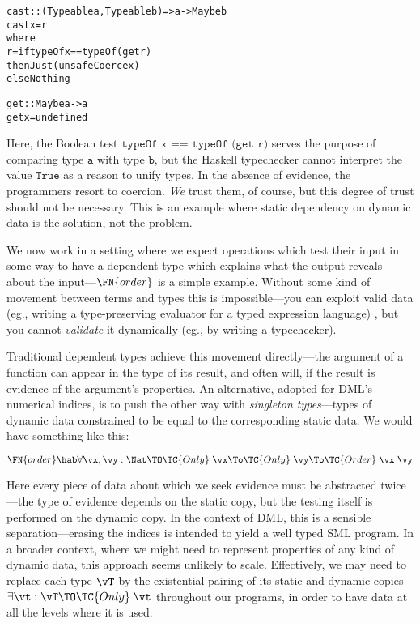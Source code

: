 \documentclass{fundam}
\begin{document}
\begin{alltt}
  cast :: (Typeable a, Typeable b) => a -> Maybe b
  cast x = r
         where
           r = if typeOf x == typeOf (get r)
               then Just (unsafeCoerce x)
               else Nothing

           get :: Maybe a -> a
           get x = undefined
\end{alltt}

Here, the Boolean test $\texttt{typeOf x == typeOf (get r)}$ serves
the purpose of comparing type $\texttt{a}$ with type $\texttt{b}$, but
the Haskell typechecker cannot interpret the value $\texttt{True}$ as
a reason to unify types. In the absence of evidence, the programmers
resort to coercion. \emph{We} trust them, of course, but this degree
of trust should not be necessary. This is an example
where static dependency on dynamic data is the solution, not the
problem.

We now work in a setting where we expect operations which test their
input in some way to have a dependent type which explains what the
output reveals about the input---$\FN{order}$ is a simple
example. Without some kind of movement between terms and types this is
impossible---you can exploit valid data (eg., writing a type-preserving
evaluator for a typed expression language) , but you cannot \emph{validate}
it dynamically (eg., by writing a typechecker).

Traditional dependent types achieve this movement directly---the
argument of a function can appear in the type of its result, and often
will, if the result is evidence of the argument's properties. An
alternative, adopted for DML's numerical indices, is to push the other
way with \emph{singleton types}---types of dynamic data constrained to
be equal to the corresponding static data. We would have something like
this:

\[
  \FN{order}\hab\forall\vx,\vy:\Nat\TO
    \TC{Only}\;\vx \To \TC{Only}\;\vy \To \TC{Order}\;\vx\;\vy
\]

Here every piece of data about which we seek evidence must be
abstracted twice---the type of evidence depends on the static copy,
but the testing itself is performed on the dynamic copy. In the
context of DML, this is a sensible separation---erasing the indices is
intended to yield a well typed SML program. In a broader context,
where we might need to represent properties of any kind of dynamic
data, this approach seems unlikely to scale. Effectively, we may need
to replace each type $\vT$ by the existential pairing of its static
and dynamic copies $\exists\vt:\vT\TO\TC{Only}\;\vt$ throughout our
programs, in order to have data at all the levels where it is used.
\end{document}
